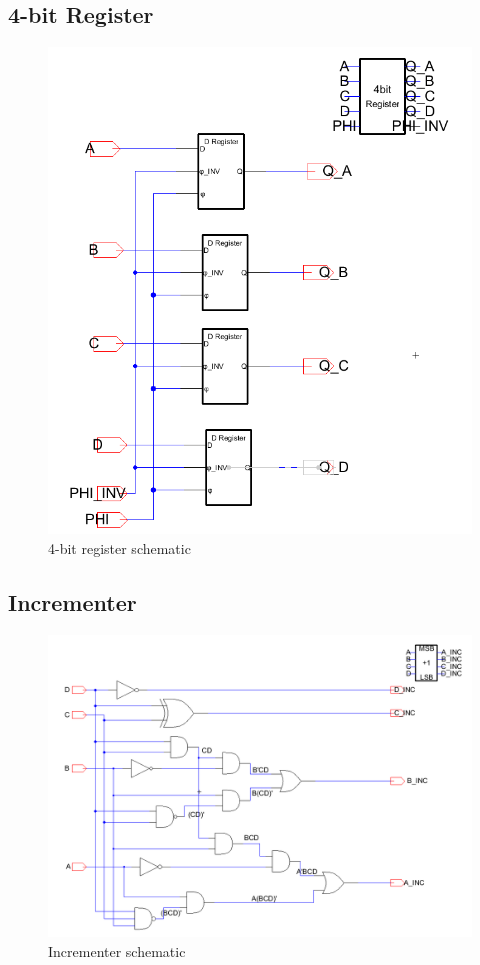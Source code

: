 \documentclass[12pt]{report}
\begin{document}
\subsection*{4-bit Register}
\begin{figure}[H]
  \centering
    \includegraphics[width=1.0\textwidth]{Schematics/4_bit_register_schematic.PNG}
  \caption{4-bit register schematic}
  \label{fig:4_bit_register_schematic}
\end{figure}

\subsection*{Incrementer}
\begin{figure}[H]
  \centering
    \includegraphics[width=1.0\textwidth]{Schematics/incrementer_schematic.PNG}
  \caption{Incrementer schematic}
  \label{fig:incrementer_schematic}
\end{figure}
\end{document}
